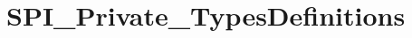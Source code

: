 \hypertarget{group___s_p_i___private___types_definitions}{}\section{S\+P\+I\+\_\+\+Private\+\_\+\+Types\+Definitions}
\label{group___s_p_i___private___types_definitions}
